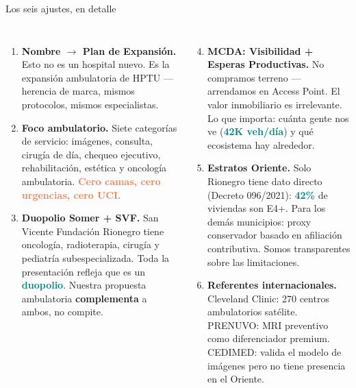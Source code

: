 \documentclass[aspectratio=169, 11pt]{beamer}
\newcommand{\highlight}[1]{\textcolor{teal}{\textbf{#1}}}
\newcommand{\danger}[1]{\textcolor{coral}{\textbf{#1}}}
\begin{document}
\begin{frame}{Los seis ajustes, en detalle}

\begin{columns}[T]
\scriptsize
\begin{enumerate}\setlength{\itemsep}{4pt}
  \item \textbf{Nombre $\to$ Plan de Expansión.} Esto no es un hospital nuevo. Es la expansión ambulatoria de HPTU --- herencia de marca, mismos protocolos, mismos especialistas.

  \item \textbf{Foco ambulatorio.} Siete categorías de servicio: imágenes, consulta, cirugía de día, chequeo ejecutivo, rehabilitación, estética y oncología ambulatoria. \danger{Cero camas, cero urgencias, cero UCI.}

  \item \textbf{Duopolio Somer + SVF.} San Vicente Fundación Rionegro tiene oncología, radioterapia, cirugía y pediatría subespecializada. Toda la presentación refleja que es un \highlight{duopolio}. Nuestra propuesta ambulatoria \textbf{complementa} a ambos, no compite.
\end{enumerate}

\scriptsize
\begin{enumerate}\setcounter{enumi}{3}\setlength{\itemsep}{4pt}
  \item \textbf{MCDA: Visibilidad + Esperas Productivas.} No compramos terreno --- arrendamos en Access Point. El valor inmobiliario es irrelevante. Lo que importa: cuánta gente nos ve (\highlight{42K veh/día}) y qué ecosistema hay alrededor.

  \item \textbf{Estratos Oriente.} Solo Rionegro tiene dato directo (Decreto 096/2021): \highlight{42\%} de viviendas son E4+. Para los demás municipios: proxy conservador basado en afiliación contributiva. Somos transparentes sobre las limitaciones.

  \item \textbf{Referentes internacionales.} Cleveland Clinic: 270 centros ambulatorios satélite. PRENUVO: MRI preventivo como diferenciador premium. CEDIMED: valida el modelo de imágenes pero no tiene presencia en el Oriente.
\end{enumerate}
\end{columns}
\end{frame}
\end{document}

